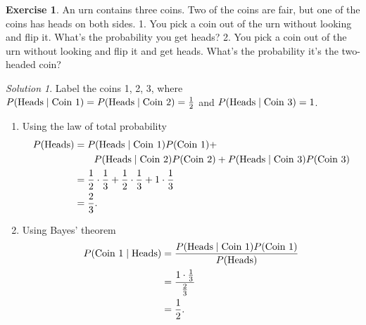 \documentclass[
]{book}
\theoremstyle{definition}
\theoremstyle{definition}
\theoremstyle{definition}
\newtheorem{exercise}{Exercise}[chapter]
\theoremstyle{definition}
\theoremstyle{remark}
\newtheorem*{solution}{Solution}
\begin{document}
\begin{exercise}
An urn contains three coins. Two of the coins are fair, but one of the coins has heads on both sides.
1. You pick a coin out of the urn without looking and flip it. What's the probability you get heads?
2. You pick a coin out of the urn without looking and flip it and get heads. What's the probability it's the two-headed coin?
\end{exercise}

\begin{solution}

Label the coins 1, 2, 3, where \(P(\hbox{Heads} \mid \hbox{Coin } 1) = P(\hbox{Heads} \mid \hbox{Coin } 2) = \frac{1}{2}\) and \(P(\hbox{Heads} \mid \hbox{Coin } 3) = 1\).

\begin{enumerate}
\def\labelenumi{\arabic{enumi}.}
\item
  Using the law of total probability
  \begin{align*}
  P(\hbox{Heads}) & = P(\hbox{Heads} \mid \hbox{Coin } 1) P(\hbox{Coin } 1) + \\
  & \qquad  P(\hbox{Heads} \mid \hbox{Coin } 2) P(\hbox{Coin } 2) + P(\hbox{Heads} \mid \hbox{Coin } 3) P(\hbox{Coin } 3) \\
  & = \frac{1}{2}\cdot\frac{1}{3} + \frac{1}{2}\cdot\frac{1}{3} + 1\cdot\frac{1}{3} \\
  & = \frac{2}{3}.
  \end{align*}
\item
  Using Bayes' theorem
  \begin{align*}
  P(\hbox{Coin 1}\mid \hbox{Heads}) &= \frac{P(\hbox{Heads} \mid \hbox{Coin 1})P(\hbox{Coin 1})}{P(\hbox{Heads})} \\
  & = \frac{1\cdot\frac{1}{3}}{\frac{2}{3}} \\
  & = \frac{1}{2}.
  \end{align*}
\end{enumerate}

\end{solution}
\end{document}
